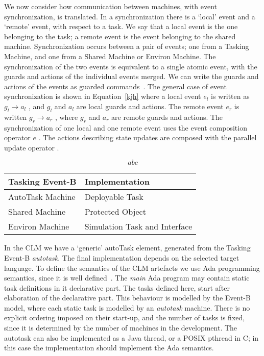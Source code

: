 We now consider how communication between machines, with event synchronization, is translated. In a synchronization there is a ‘local’ event and a ‘remote’ event, with respect to a task. We say that a local event is the one belonging to the task; a remote event is the event belonging to the shared machine. Synchronization occurs between a pair of events; one from a Tasking Machine, and one from a Shared Machine or Environ Machine. The synchronization of the two events is equivalent to a single atomic event, with the guards and actions of the individual events merged. We can write the guards and actions of the events as guarded commands~\cite{Dijkstra75a}. The general case of event synchronization is shown in Equation~\ref{kjh} where a local event $e_l$ is written as $g_l \rightarrow a_l$ , and $g_l$ and $a_l$ are local guards and actions. The remote event $e_r$ is written $g_r \rightarrow a_r$ , where $g_r$ and
$a_r$ are remote guards and actions. The synchronization of one local and one
remote event uses the event composition operator $e$ . The actions describing
state updates are composed with the parallel update operator .

\begin{equation}\label{kjh}
abc
\end{equation}


\begin{center}
\begin{tabular}{l|l}
Tasking Event-B & Implementation \\ 
\hline
AutoTask Machine & Deployable Task\\
Shared Machine &	Protected Object\\
Environ Machine &	Simulation Task and Interface
\end{tabular}
\end{center}
%
In the CLM we have a `generic' autoTask element, generated from the Tasking Event-B \emph{autotask}. The final implementation depends on the selected target language. To define the semantics of the CLM artefacts we use Ada programming semantics, since it is well defined~\cite{ada2005}. The \emph{main} Ada program may contain static task definitions in it declarative part. The tasks defined here, start after elaboration of the declarative part. This behaviour is modelled by the Event-B model, where each static task is modelled by an \emph{autotask} machine. There is no explicit ordering imposed on their start-up, and  the number of tasks is fixed, since it is determined by the number of machines in the development. The autotask can also be implemented as a Java thread, or a POSIX pthread in C; in this case the implementation should implement the Ada semantics.

